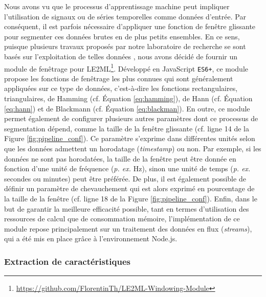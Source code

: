 Nous avons vu que le processus d'apprentissage machine peut impliquer l'utilisation de signaux ou de séries temporelles comme données d'entrée. Par conséquent, il est parfois nécessaire d'appliquer une fonction de fenêtre glissante pour segmenter ces données brutes en de plus petits ensembles. En ce sens, puisque plusieurs travaux proposés par notre laboratoire de recherche se sont basés sur l'exploitation de telles données \citep{Thullier2017,Chapron2018,Bouchard2020}, nous avons décidé de fournir un module de fenêtrage pour \acs{LE2ML}\footnote{\url{https://github.com/FlorentinTh/LE2ML-Windowing-Module}}. Développé en JavaScript \texttt{ES6+}, ce module propose les fonctions de fenêtrage les plus connues qui sont généralement appliquées sur ce type de données, c'est-à-dire les fonctions rectangulaires, triangulaires, de Hamming (cf. Équation \ref{eq:hamming}), de Hann (cf. Équation \ref{eq:hann}) et de Blackmann (cf. Équation \ref{eq:blackman}). En outre, ce module permet également de configurer plusieurs autres paramètres dont ce processus de segmentation dépend, comme la taille de la fenêtre glissante (cf. ligne 14 de la Figure \ref{fig:pipeline_conf}). Ce paramètre s'exprime dans différentes unités selon que les données admettent un horodatage (\textit{timestamp}) ou non. Par exemple, si les données ne sont pas horodatées, la taille de la fenêtre peut être donnée en fonction d'une unité de fréquence (\textit{p. ex.} Hz), sinon une unité de temps (\textit{p. ex.} secondes ou minutes) peut être préférée. De plus, il est également possible de définir un paramètre de chevauchement qui est alors exprimé en pourcentage de la taille de la fenêtre (cf. ligne 18 de la Figure \ref{fig:pipeline_conf}). Enfin, dans le but de garantir la meilleure efficacité possible, tant en termes d'utilisation des ressources de calcul que de consommation mémoire, l'implémentation de ce module repose principalement sur un traitement des données en flux (\textit{streams}), qui a été mis en place grâce à l'environnement Node.js.

\subsubsection{Extraction de caractéristiques}

